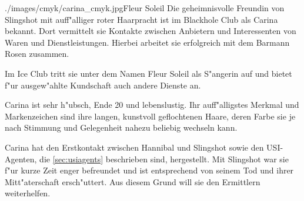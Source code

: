 
\begin{sideimagebox}[r]{0.6}{./images/cmyk/carina_cmyk.jpg}{Fleur Soleil}
    Die geheimnisvolle Freundin von Slingshot mit auff"alliger roter Haarpracht ist im Blackhole Club als Carina bekannt. Dort vermittelt sie Kontakte zwischen Anbietern und Interessenten von Waren und Dienstleistungen. Hierbei arbeitet sie erfolgreich mit dem Barmann Rosen zusammen.
    
    Im Ice Club tritt sie unter dem Namen Fleur Soleil als S"angerin auf und bietet f"ur ausgew"ahlte Kundschaft auch andere Dienste an.
    
    Carina ist sehr h"ubsch, Ende 20 und lebenslustig. Ihr auff"alligstes Merkmal und Markenzeichen sind ihre langen, kunstvoll geflochtenen Haare, deren Farbe sie je nach Stimmung und Gelegenheit nahezu beliebig wechseln kann.

    Carina hat den Erstkontakt zwischen Hannibal und Slingshot sowie den USI-Agenten, die \cref{sec:usiagents} beschrieben sind, hergestellt. Mit Slingshot war sie f"ur kurze Zeit enger befreundet und ist entsprechend von seinem Tod und ihrer Mitt"aterschaft ersch"uttert. Aus diesem Grund will sie den Ermittlern weiterhelfen.
\end{sideimagebox}
\vfill\pagebreak
